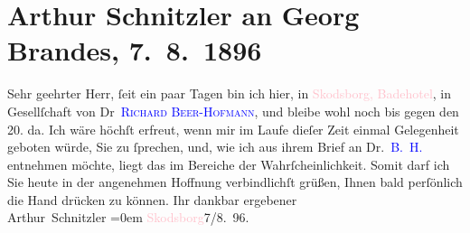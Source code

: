 

               \section[Arthur Schnitzler an Georg Brandes, 7. 8. 1896]{ Arthur Schnitzler an Georg Brandes, 7. 8. 1896}\nopagebreak{}\rehead{ }\normalsize\beginnumbering{} \toendnotes[C]{\smallbreak\pagebreak[2]} 
\pstart{}{\pb}Sehr geehrter Herr,\pend\pstart
           ſeit ein paar Tagen bin ich hier, in \textcolor{pink}{Skodsborg,
                        Badehotel}{}\ledrightnote{\textcolor{pink}{Badehotel}}, in Gesellſchaft von Dr \textcolor{blue}{\textsc{Richard Beer-Hofmann}}{}\ledrightnote{\textcolor{blue}{Richard Beer-Hofmann}}, und bleibe wohl noch bis gegen den 20. da. Ich wäre
                    höchſt erfreut, wenn mir im Laufe dieſer Zeit einmal Gelegenheit geboten würde,
                    Sie zu ſprechen, und, wie ich aus ihrem Brief an Dr. \textcolor{blue}{B. H.}{}\ledrightnote{\textcolor{blue}{Richard Beer-Hofmann}} entnehmen {\pb}möchte,
                    liegt das im Bereiche der Wahrſcheinlichkeit. Somit darf ich Sie heute in der
                    angenehmen Hoffnung verbindlichſt grüßen, Ihnen bald perſönlich die Hand drücken
                    zu können.\pend
           \pstart
           Ihr dankbar ergebener{\\[\baselineskip]}\spacefill\mbox{Arthur Schnitzler}\pend
           \leftskip=0em{}\pstart
           \textcolor{pink}{Skodsborg}{}\ledrightnote{\textcolor{pink}{Skodsborg}}{ }7/8. 96.\pend
           \endnumbering{}  
      